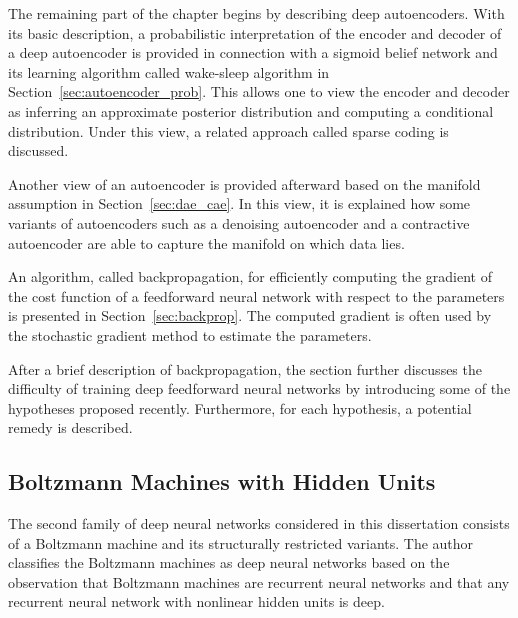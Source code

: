 \documentclass{now}
\begin{document}
The remaining part of the chapter begins by describing deep autoencoders. With
its basic description, a probabilistic interpretation of the encoder and
decoder of a deep autoencoder is provided in connection with a sigmoid belief
network and its learning algorithm called wake-sleep algorithm in
Section~\ref{sec:autoencoder_prob}. This allows one to view the encoder and
decoder as inferring an approximate posterior distribution and computing a
conditional distribution. Under this view, a related approach called sparse
coding is discussed.

Another view of an autoencoder is provided afterward based on the manifold
assumption in Section~\ref{sec:dae_cae}. In this view, it is explained how some
variants of autoencoders such as a denoising autoencoder and a contractive
autoencoder are able to capture the manifold on which data lies. 

An algorithm, called backpropagation, for efficiently computing the gradient of
the cost function of a feedforward neural network with respect to the
parameters is presented in Section~\ref{sec:backprop}. The computed gradient is
often used by the stochastic gradient method to estimate the parameters.

After a brief description of backpropagation, the section further discusses the
difficulty of training deep feedforward neural networks by introducing some of
the hypotheses proposed recently.  Furthermore, for each hypothesis, a
potential remedy is described.

\subsection{Boltzmann Machines with Hidden Units}

The second family of deep neural networks considered in this dissertation
consists of a Boltzmann machine and its structurally restricted variants. The
author classifies the Boltzmann machines as deep neural networks based on the
observation that Boltzmann machines are recurrent neural networks and that any
recurrent neural network with nonlinear hidden units is deep.
\end{document}
